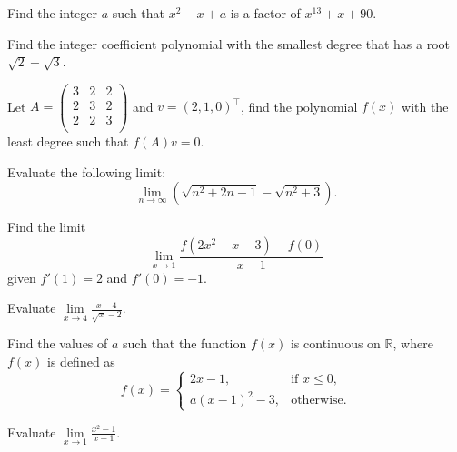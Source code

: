 \begin{problem} Find the integer $a$ such that $x^2-x+a$ is a factor of $x^{13}+x+90$. 
\end{problem}

\begin{problem} Find the integer coefficient polynomial with the smallest degree that has a root $\sqrt{2}+\sqrt{3}$. 
\end{problem}

\begin{problem} Let $A=\left(
        \begin{array}{ccc}
          3 & 2 & 2\\
          2 & 3 & 2\\
          2 & 2 & 3\\
        \end{array}
      \right)
$ and $v=(2,1,0)^{\top}$, find the polynomial $f(x)$ with the least degree such that $f(A)v=0.$
\end{problem}

\newpage 







\begin{problem} Evaluate the following limit:
\begin{equation*}
    \lim_{n \to \infty} \left(\sqrt{n^2+2n-1}-\sqrt{n^2+3}\right).
\end{equation*}
\end{problem}

\begin{problem} Find the limit $$\lim\limits_{x\to 1}\frac{f(2x^2+x-3)-f(0)}{x-1}$$ given $f'(1)=2$ and $f'(0)=-1$.

\end{problem}

\begin{problem} Evaluate $\lim\limits_{x\to 4}\frac{x-4}{\sqrt{x}-2}$.
\end{problem}

\begin{problem} Find the values of  $a$ such that the function $f(x)$ is continuous on $\mathbb{R}$, where $f(x)$ is defined as 
\[
f(x)=\begin{cases} 2x-1, &\text{if } x\leq 0,\\ 
a(x-1)^2-3, & \text{otherwise.}
\end{cases}
\]
\end{problem}

\begin{problem} Evaluate $\lim\limits_{x\to 1}\frac{x^2-1}{x+1}$.
\end{problem}

